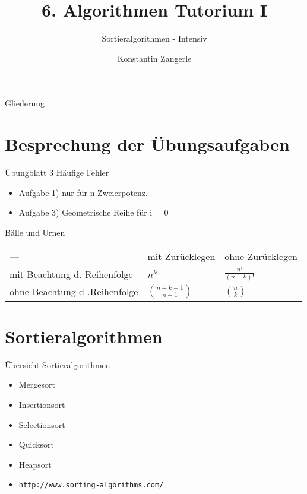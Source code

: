\documentclass[18pt]{beamer}
\title[Algo I Tut]{6. Algorithmen Tutorium I}
\subtitle{Sortieralgorithmen - Intensiv}
\author[Zangerle]{Konstantin Zangerle}
\institute{Institut für Theoretische Informatik}
\begin{document}

\begin{frame}
\titlepage
\end{frame}

\begin{frame}{Gliederung}
 \tableofcontents
\end{frame}


\section{Besprechung der Übungsaufgaben}
\begin{frame}{Übungblatt 3}
Häufige Fehler
\begin{itemize}
 \item Aufgabe 1) nur für n Zweierpotenz.
 \item Aufgabe 3) Geometrische Reihe für i = 0 
\end{itemize}
\end{frame}


\begin{frame}{Bälle und Urnen}
 \begin{tabular}{lll}
  --- 				&	mit Zurücklegen 	& ohne Zurücklegen 	\\
 mit Beachtung d. Reihenfolge  	& 	$n^k$			& $\frac{n!}{(n-k)!}$	\\
 ohne Beachtung d .Reihenfolge 	& 	$\binom{n+k-1}{n-1}$	& $\binom{n}{k}$
 \end{tabular}

\end{frame}

\section{Sortieralgorithmen}
\begin{frame}[fragile]{Übersicht Sortieralgorithmen}
 \begin{itemize}
  \item Mergesort
  \item Insertionsort
  \item Selectionsort
  \item Quicksort
  \item Heapsort
  \item \verb|http://www.sorting-algorithms.com/|
 \end{itemize}

\end{frame}
\end{document}
